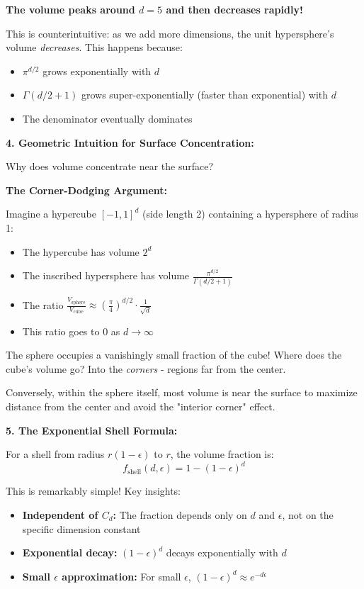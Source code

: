 \documentclass[12pt]{article}
\begin{document}
\begin{explanation}
\textbf{The volume peaks around \(d=5\) and then decreases rapidly!}

This is counterintuitive: as we add more dimensions, the unit hypersphere's volume \textit{decreases}. This happens because:
\begin{itemize}
    \item \(\pi^{d/2}\) grows exponentially with \(d\)
    \item \(\Gamma(d/2 + 1)\) grows super-exponentially (faster than exponential) with \(d\)
    \item The denominator eventually dominates
\end{itemize}

\textbf{4. Geometric Intuition for Surface Concentration:}

Why does volume concentrate near the surface?

\textbf{The Corner-Dodging Argument:}

Imagine a hypercube \([-1, 1]^d\) (side length 2) containing a hypersphere of radius 1:

\begin{itemize}
    \item The hypercube has volume \(2^d\)
    \item The inscribed hypersphere has volume \(\frac{\pi^{d/2}}{\Gamma(d/2 + 1)}\)
    \item The ratio \(\frac{V_{\text{sphere}}}{V_{\text{cube}}} \approx \left(\frac{\pi}{4}\right)^{d/2} \cdot \frac{1}{\sqrt{d}}\)
    \item This ratio goes to 0 as \(d \to \infty\)
\end{itemize}

The sphere occupies a vanishingly small fraction of the cube! Where does the cube's volume go? Into the \textit{corners} - regions far from the center.

Conversely, within the sphere itself, most volume is near the surface to maximize distance from the center and avoid the "interior corner" effect.

\textbf{5. The Exponential Shell Formula:}

For a shell from radius \(r(1-\epsilon)\) to \(r\), the volume fraction is:
\[
f_{\text{shell}}(d, \epsilon) = 1 - (1-\epsilon)^d
\]

This is remarkably simple! Key insights:

\begin{itemize}
    \item \textbf{Independent of \(C_d\):} The fraction depends only on \(d\) and \(\epsilon\), not on the specific dimension constant
    \item \textbf{Exponential decay:} \((1-\epsilon)^d\) decays exponentially with \(d\)
    \item \textbf{Small \(\epsilon\) approximation:} For small \(\epsilon\), \((1-\epsilon)^d \approx e^{-d\epsilon}\)
\end{itemize}


\end{explanation}
\end{document}
